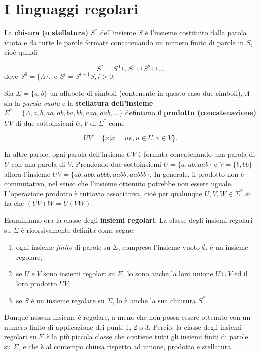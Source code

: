 \documentclass[10pt]{\classname}
\begin{document}
\section{I linguaggi regolari}

La \textbf{chisura (o stellatura)} $S^*$ dell'insieme $S$ è l'insieme
costituito dalla parola vuota e da tutte le parole formate concatenando un
numero finito di parole in $S$, cioè quindi

$$S^* = S^0 \cup S^1 \cup S^2 \cup \dots$$
dove $S^0 = \{\Lambda\},$ e $S^i=S^{i-1}S, i > 0$.

Sia $\Sigma = \{a, b\}$ un alfabeto di simboli (contenente in questo caso due
simboli), $\Lambda$ sia la \emph{parola vuota} e la \textbf{stellatura
dell'insieme} $\Sigma^* = \{\Lambda, a, b, aa, ab, ba, bb, aaa, aab, \dots\}$
definiamo il \textbf{prodotto (concatenazione)} $UV$ di due sottoinsiemi $U, V$
di $\Sigma^*$ come 

$$UV = \{x | x= uv, u \in U, v \in V\}.$$

In altre parole, ogni parola dell'insieme $UV$ è formata concatenando una
parola di $U$ con una parola di $V$. Prendendo due sottoinsiemi $U=\{a, ab,
aab\}$ e $V=\{b, bb\}$ allora l'insieme $UV = \{ab, abb, abbb, aabb, aabbb\}$.
In generale, il prodotto non è commutativo, nel senso che l'insieme ottenuto
potrebbe non essere uguale. L'operazione prodotto è tuttavia associativa, cioè
per qualunque $U, V, W \in \Sigma^*$ si ha che $(UV)W = U(VW)$.

Esaminiamo ora la classe degli \textbf{insiemi regolari}. La classe degli insiemi regolari su $\Sigma$ è ricorsivamente definita come segue:
\begin{enumerate}
    \item ogni insieme \emph{finito} di parole su $\Sigma$, compreso l'insieme
        vuoto $\emptyset$, è un insieme regolare;
    \item se $U$ e $V$ sono insiemi regolari su $\Sigma$, lo sono anche la loro
        unione $U\cup V$ ed il loro prodotto $UV$;
    \item se $S$ è un insieme regolare su $\Sigma$, lo è anche la sua chiusura
        $S^*$.
\end{enumerate}

Dunque nessun insieme è regolare, a meno che non possa essere ottenuto con un
numero finito di applicazione dei punti 1, 2 o 3. Perciò, la classe degli
insiemi regolari su $\Sigma$ è la più piccola classe che contiene tutti gli
insiemi finiti di parole su $\Sigma$, e che è al contempo chiusa rispetto ad
unione, prodotto e stellatura.
\end{document}
